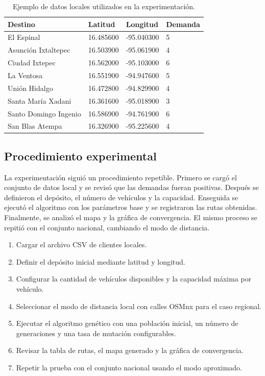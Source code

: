 \documentclass[runningheads]{llncs}
\begin{document}
\begin{table}
\centering
\caption{Ejemplo de datos locales utilizados en la experimentaci\'on.}
\begin{tabular}{llll}
\toprule
Destino & Latitud & Longitud & Demanda \\
\midrule
El Espinal & 16.485600 & -95.040300 & 5 \\
Asunci\'on Ixtaltepec & 16.503900 & -95.061900 & 4 \\
Ciudad Ixtepec & 16.562000 & -95.103000 & 6 \\
La Ventosa & 16.551900 & -94.947600 & 5 \\
Uni\'on Hidalgo & 16.472800 & -94.829900 & 4 \\
Santa Mar\'ia Xadani & 16.361600 & -95.018900 & 3 \\
Santo Domingo Ingenio & 16.586900 & -94.761900 & 6 \\
San Blas Atempa & 16.326900 & -95.225600 & 4 \\
\bottomrule
\end{tabular}
\end{table}

\subsection{Procedimiento experimental}

La experimentaci\'on sigui\'o un procedimiento repetible. Primero se carg\'o el
conjunto de datos local y se revis\'o que las demandas fueran positivas. Despu\'es
se definieron el dep\'osito, el n\'umero de veh\'iculos y la capacidad. Enseguida
se ejecut\'o el algoritmo con los par\'ametros base y se registraron las rutas
obtenidas. Finalmente, se analiz\'o el mapa y la gr\'afica de convergencia. El
mismo proceso se repiti\'o con el conjunto nacional, cambiando el modo de
distancia.

\begin{enumerate}
    \item Cargar el archivo CSV de clientes locales.
    \item Definir el dep\'osito inicial mediante latitud y longitud.
    \item Configurar la cantidad de veh\'iculos disponibles y la capacidad
    m\'axima por veh\'iculo.
    \item Seleccionar el modo de distancia local con calles OSMnx para el caso
    regional.
    \item Ejecutar el algoritmo gen\'etico con una poblaci\'on inicial, un n\'umero
    de generaciones y una tasa de mutaci\'on configurables.
    \item Revisar la tabla de rutas, el mapa generado y la gr\'afica de
    convergencia.
    \item Repetir la prueba con el conjunto nacional usando el modo aproximado.
\end{enumerate}
\end{document}
